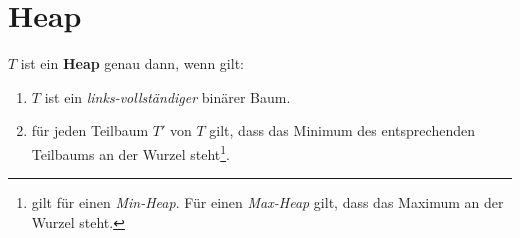 \section{Heap}

$T$ ist ein \textbf{Heap} genau dann, wenn gilt:

\begin{enumerate}
    \item $T$ ist ein \textit{links-vollständiger} binärer Baum.
    \item für jeden Teilbaum $T'$ von $T$ gilt, dass das Minimum des entsprechenden Teilbaums an der Wurzel steht\footnote{
    gilt für einen \textit{Min-Heap}. Für einen \textit{Max-Heap} gilt, dass das Maximum an der Wurzel steht.
    }.
\end{enumerate}